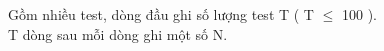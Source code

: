 Gồm nhiều test, dòng đầu ghi số lượng test T ( T $\le$ 100 ).   
\\   T dòng sau mỗi dòng ghi một số N.  

\